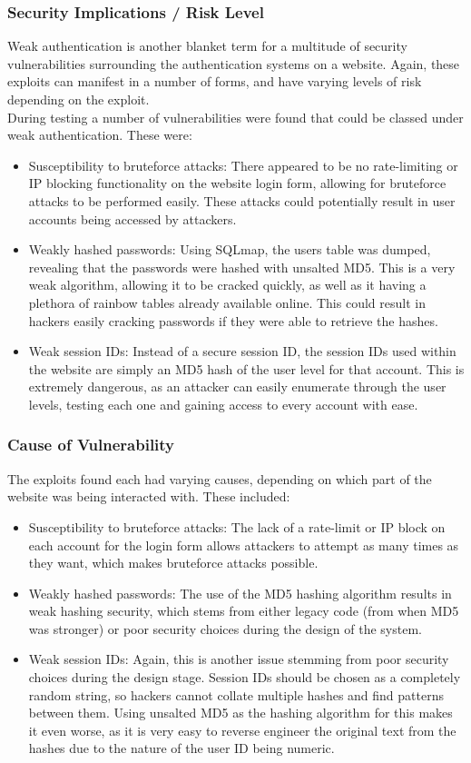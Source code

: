 \documentclass{report}
\begin{document}
\subsubsection{Security Implications / Risk Level}
Weak authentication is another blanket term for a multitude of security vulnerabilities surrounding the authentication systems on a website. Again, these exploits can manifest in a number of forms, and have varying levels of risk depending on the exploit.\\
During testing a number of vulnerabilities were found that could be classed under weak authentication. These were:
\begin{itemize}
	\item Susceptibility to bruteforce attacks: There appeared to be no rate-limiting or IP blocking functionality on the website login form, allowing for bruteforce attacks to be performed easily. These attacks could potentially result in user accounts being accessed by attackers.
	\item Weakly hashed passwords: Using SQLmap, the users table was dumped, revealing that the passwords were hashed with unsalted MD5. This is a very weak algorithm, allowing it to be cracked quickly, as well as it having a plethora of rainbow tables already available online. This could result in hackers easily cracking passwords if they were able to retrieve the hashes.
	\item Weak session IDs: Instead of a secure session ID, the session IDs used within the website are simply an MD5 hash of the user level for that account. This is extremely dangerous, as an attacker can easily enumerate through the user levels, testing each one and gaining access to every account with ease.
\end{itemize}

\subsubsection{Cause of Vulnerability}
The exploits found each had varying causes, depending on which part of the website was being interacted with. These included:
\begin{itemize}
	\item Susceptibility to bruteforce attacks: The lack of a rate-limit or IP block on each account for the login form allows attackers to attempt as many times as they want, which makes bruteforce attacks possible. 
	\item Weakly hashed passwords: The use of the MD5 hashing algorithm results in weak hashing security, which stems from either legacy code (from when MD5 was stronger) or poor security choices during the design of the system.
	\item Weak session IDs: Again, this is another issue stemming from poor security choices during the design stage. Session IDs should be chosen as a completely random string, so hackers cannot collate multiple hashes and find patterns between them. Using unsalted MD5 as the hashing algorithm for this makes it even worse, as it is very easy to reverse engineer the original text from the hashes due to the nature of the user ID being numeric.
\end{itemize}
\end{document}
